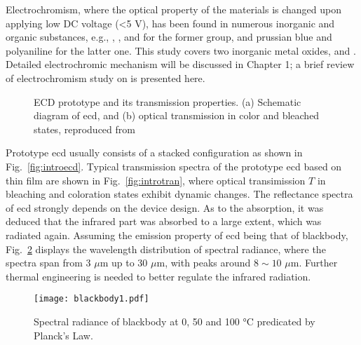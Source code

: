 Electrochromism, where the optical property of the materials is changed upon applying low DC voltage (\textless 5 V), has been found in numerous inorganic and organic substances, e.g., , , and  for the former group, and prussian blue and polyaniline for the latter one. This study covers two inorganic metal oxides,  and . Detailed electrochromic mechanism will be discussed in Chapter 1; a brief review of electrochromism study on  is presented here. 
\begin{figure}[htb]
\centering
{}\hspace{0.04\textwidth}
\caption[ECD prototype and its transmission properties]{ECD prototype and its transmission properties. (a) Schematic diagram of \gls{ecd}, and (b) optical transmission in color and bleached states, reproduced from \cite{Lampert1998}}
\label{fig:introec}
\end{figure}

Prototype \gls{ecd} usually consists of a stacked configuration as shown in Fig.~\ref{fig:introecd}. Typical transmission spectra of the prototype \gls{ecd} based on  thin film are shown in Fig.~\ref{fig:introtran},\cite{Lampert1998} where optical transimission $T$ in bleaching and coloration states exhibit dynamic changes. The reflectance spectra of  \gls{ecd} strongly depends on the device design.\cite{OBrien1999} As to the absorption, it was deduced that the infrared part was absorbed to a large extent, which was radiated again. Assuming the emission property of \gls{ecd} being that of blackbody, Fig.~\ref{fig:introbb} displays the wavelength distribution of spectral radiance, where the spectra span from 3 $\mu$m up to 30 $\mu$m, with peaks around $8\sim10$ $\mu$m. Further thermal engineering is needed to better regulate the infrared radiation. 

\begin{figure}[htb]
\centering
\texttt{[image: blackbody1.pdf]}
\caption[Spectral radiance of blackbody at 0, 50 and 100 \si{\degreeCelsius} predicated by Planck's Law]{Spectral radiance of blackbody at 0, 50 and 100 \si{\degreeCelsius} predicated by Planck's Law.}
\label{fig:introbb}
\end{figure}


